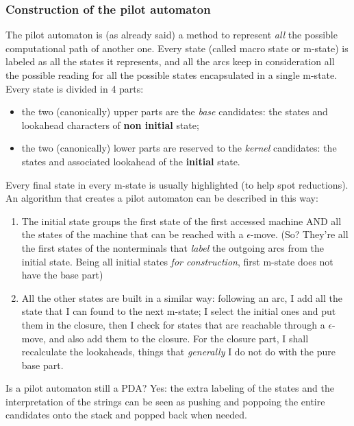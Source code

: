 \documentclass[10pt,a4paper]{article}
\begin{document}
				\subsubsection{Construction of the pilot automaton}
					The pilot automaton is (as already said) a method to represent \emph{all} the possible computational path of another one. Every state (called macro state or m-state) is labeled as all the states it represents, and all the arcs keep in consideration all the possible reading for all the possible states encapsulated in a single m-state.\\
					Every state is divided in 4 parts:
					\begin{itemize}
						\item the two (canonically) upper parts are the \emph{base} candidates: the states and lookahead characters of \textbf{non initial} state;
						\item the two (canonically) lower parts are reserved to the \emph{kernel} candidates: the states and associated lookahead of the \textbf{initial} state.
					\end{itemize}
					Every final state in every m-state is usually highlighted (to help spot reductions).\\
					An algorithm that creates a pilot automaton can be described in this way:
					\begin{enumerate}
						\item The initial state groups the first state of the first accessed machine AND all the states of the machine that can be reached with a $\epsilon$-move. (So? They're all the first states of the nonterminals that \emph{label} the outgoing arcs from the initial state. Being all initial states \emph{for construction}, first m-state does not have the base part)
						\item All the other states are built in a similar way: following an arc, I add all the state that I can found to the next m-state; I select the initial ones and put them in the closure, then I check for states that are reachable through a $\epsilon$-move, and also add them to the closure. For the closure part, I shall recalculate the lookaheads, things that \emph{generally} I do not do with the pure base part.
					\end{enumerate}
					Is a pilot automaton still a PDA? Yes: the extra labeling of the states and the interpretation of the strings can be seen as pushing and poppoing the entire candidates onto the stack and popped back when needed.
					
\end{document}
